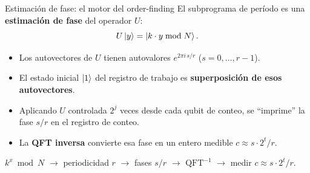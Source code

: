 \documentclass[aspectratio=169]{beamer}
\begin{document}
\begin{frame}{Estimación de fase: el motor del order-finding}
  El subprograma de período es una \textbf{estimación de fase} del operador $U$:
  \[
    U\ket{y} = \ket{k\cdot y \bmod N}.
  \]
  \begin{itemize}
    \item Los autovectores de $U$ tienen autovalores $e^{2\pi i\,s/r}$
          ($s=0,\ldots,r-1$).
    \item El estado inicial $\ket{1}$ del registro de trabajo es
          \textbf{superposición de esos autovectores}.
    \item Aplicando $U$ controlada $2^j$ veces desde cada qubit de conteo,
          se ``imprime'' la fase $s/r$ en el registro de conteo.
    \item La \textbf{QFT inversa} convierte esa fase en un entero medible
          $c\approx s\cdot 2^t/r$.
  \end{itemize}

  \begin{block}{}
    \small
    $k^x\bmod N$ \;$\longrightarrow$\; periodicidad $r$
    \;$\longrightarrow$\; fases $s/r$
    \;$\longrightarrow$\; $\mathrm{QFT}^{-1}$
    \;$\longrightarrow$\; medir $c\approx s\cdot 2^t/r$.
  \end{block}

\end{frame}
\end{document}
